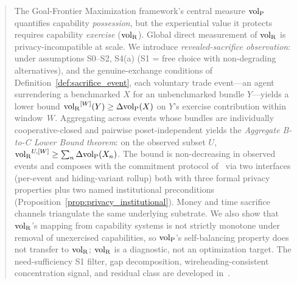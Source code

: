 \begin{abstract}
The Goal-Frontier Maximization framework's central measure $\volL$ quantifies
    capability \emph{possession}, but the experiential value it protects
    requires capability \emph{exercise} ($\volR$).  Global direct measurement
    of $\volR$ is privacy-incompatible at scale.  We introduce
    \emph{revealed-sacrifice observation}: under assumptions S0--S2, S4(a) (S1
    = free choice with non-degrading alternatives), and the genuine-exchange
    conditions of Definition~\ref{def:sacrifice_event}, each voluntary trade
    event---an agent surrendering a benchmarked $X$ for an unbenchmarked bundle
    $Y$---yields a lower bound $\volR^{[W]}(Y) \geq \Delta\volL(X)$ on $Y$'s
    exercise contribution within window~$W$.  Aggregating across events whose
    bundles are individually cooperative-closed and pairwise poset-independent
    yields the \emph{Aggregate B-to-C Lower Bound theorem}: on the observed
    subset $U$, $\volR^{U,[W]} \geq \sum_n \Delta\volL(X_n)$.  The bound is
    non-decreasing in observed events and composes with the commitment protocol
    of~\citep[Exogenous~Verification]{lasser2026exo} via two interfaces (per-event and hiding-variant
    rollup) both with three formal privacy properties plus two named
    institutional preconditions (Proposition~\ref{prop:privacy_institutional}).
    Money and time sacrifice channels triangulate the same underlying
    substrate.  We also show that $\volR$'s mapping from capability systems is
    not strictly monotone under removal of unexercised capabilities, so
    $\volL$'s self-balancing property does not transfer to $\volR$; $\volR$ is
    a diagnostic, not an optimization target.  The need-sufficiency S1 filter,
    gap decomposition, wireheading-consistent concentration signal, and
    residual class are developed
    in~\citep[Need~Sufficiency]{lasser2026paper8b}.
\end{abstract}
